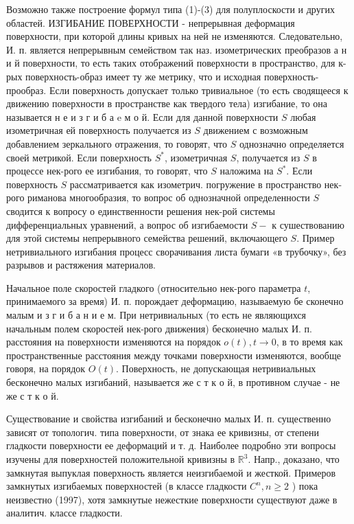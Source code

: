 \documentclass[10pt]{article}
\begin{document}
Возможно также построение формул типа (1)-(3) для полуплоскости и других областей. ИЗГИБАНИЕ ПОВЕРХНОСТИ - непрерывная деформация поверхности, при которой длины кривых на ней не изменяются. Следовательно, И. п. является непрерывным семейством так наз. изометрических преобразов а н и й поверхности, то есть таких отображений поверхности в пространство, для к-рых поверхность-образ имеет ту же метрику, что и исходная поверхность-прообраз. Если поверхность допускает только тривиальное (то есть сводящееся к движению поверхности в пространстве как твердого тела) изгибание, то она называется н е и з г и б а e м о й. Если для данной поверхности $S$ любая изометричная ей поверхность получается из $S$ движением с возможным добавлением зеркального отражения, то говорят, что $S$ однозначно определяется своей метрикой. Если поверхность $S^{*}$, изометричная $S$, получается из $S$ в процессе нек-рого ее изгибания, то говорят, что $S$ наложима на $S^{*}$. Если поверхность $S$ рассматривается как изометрич. погружение в пространство нек-рого риманова многообразия, то вопрос об однозначной определенности $S$ сводится к вопросу о единственности решения нек-рой системы дифференциальных уравнений, а вопрос об изгибаемости $S-$ к сушествованию для этой системы непрерывного семейства решений, включающего $S$. Пример нетривиального изгибания процесс сворачивания листа бумаги «в трубочку», без разрывов и растяжения материалов.



Начальное поле скоростей гладкого (относительно нек-рого параметра $t$, принимаемого за время) И. п. порождает деформацию, называемую бе сконечно малым и з г и б а н и е м. При нетривиальных (то есть не являющихся начальным полем скоростей нек-рого движения) бесконечно малых И. п. расстояния на поверхности изменяются на порядок $o(t), t \rightarrow 0$, в то время как пространственные расстояния между точками поверхности изменяются, вообще говоря, на порядок $O(t)$. Поверхность, не допускающая нетривиальных бесконечно малых изгибаний, называется же с т к о й, в противном случае - не же с т к о й.



Существование и свойства изгибаний и бесконечно малых И. п. существенно зависят от топологич. типа поверхности, от знака ее кривизны, от степени гладкости поверхности ее деформаций и т. д. Наиболее подробно эти вопросы изучены для поверхностей положительной кривизны в $\mathbb{R}^{3}$. Напр., доказано, что замкнутая выпуклая поверхность является неизгибаемой и жесткой. Примеров замкнутых изгибаемых поверхностей (в классе гладкости $C^{n}, n \geqslant 2$ ) пока неизвестно (1997), хотя замкнутые нежесткие поверхности существуют даже в аналитич. классе гладкости.
\end{document}
